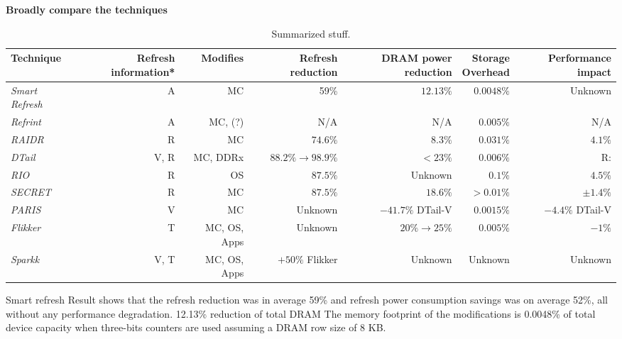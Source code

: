 \textbf{Broadly compare the techniques}
\begin{table*}[t]
	\caption{\label{tbl:summary}Summarized stuff.}
        \begin{center}
			\normalsize
			\begin{tabular}{ l r r r r r r}
				\textbf{Technique} & \parbox{2cm}{ \textbf{Refresh \linebreak information*}} & \textbf{Modifies} & \parbox{1.7cm}{ \textbf{Refresh \linebreak reduction}} & \parbox{2.2cm}{ \textbf{DRAM power \linebreak reduction}} & \parbox{1.2cm}{\textbf{Storage \newline Overhead}} & \parbox{1.5cm}{\textbf{Performance impact}} \vspace{0.05cm} \\
				\hline
				\textit{Smart Refresh} & A & MC & 59\% & $12.13\%$ & $0.0048\%$  & Unknown  \\
				\textit{Refrint} & A & MC, (?) & N/A & N/A  & $0.005\%$  & N/A  \\
				\hline
				\textit{RAIDR} & R & MC & $74.6\%$ & $8.3\%$  & $0.031\%$  & $4.1\%$  \\
				\textit{DTail} & V, R & MC, DDRx & $88.2\% \to 98.9\% $ & $< 23\%$  & $0.006\%$ & R:  \\
				\textit{RIO} & R & OS & $87.5\%$ & Unknown  & $0.1\%$  & $4.5\%$ \\
				\textit{SECRET} & R & MC & $87.5\%$ & $18.6\%$  & $>0.01\%$  & $\pm 1.4\%$  \\
				\hline
				\textit{PARIS} & V & MC & Unknown & $-41.7\%$ DTail-V  & $0.0015\%$  & $-4.4\%$ DTail-V  \\
				\hline
				\textit{Flikker} & T & MC, OS, Apps & Unknown & $20\% \to 25\%$  & $0.005\%$  & $-1\%$   \\
				\textit{Sparkk} & V, T  & MC, OS, Apps &  $+50\%$ Flikker & Unknown & Unknown  & Unknown \\
				\hline
			\end{tabular}
		\end{center}
\end{table*}

Smart refresh
Result shows that the refresh reduction was in average 59\%
and refresh power consumption savings was on average 52\%,
all without any performance degradation. 12.13\% reduction of total DRAM
The memory
footprint of the modifications is 0.0048\% of total device
capacity when three-bits counters are used assuming a DRAM
row size of 8 KB.


